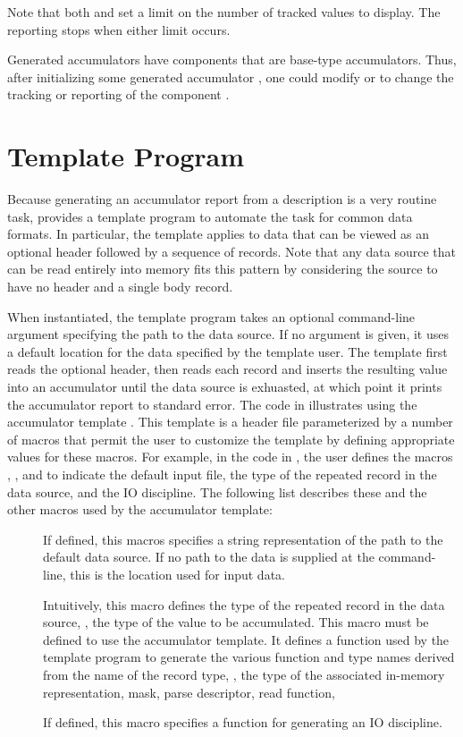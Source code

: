 Note that both  and  set a limit on
the number of tracked values to display.  The reporting stops when
either limit occurs.

Generated accumulators have components that are base-type
accumulators.  Thus, after initializing some generated accumulator
, one could modify  or
 to change the tracking or reporting of the
 component .

\section{Template Program}
Because generating an accumulator report from a \pads{} description is
a very routine task, \pads{} provides a template program to automate
the task for common data formats.  In particular, the template applies
to data that can be viewed as an optional header followed by a
sequence of records.  Note that any data source that can be read
entirely into memory fits this pattern by considering the source to
have no header and a single body record.

When instantiated, the template program takes an optional command-line
argument specifying the path to the data source. If no argument is
given, it uses a default location for the data specified by the
template user.
The template first reads the optional header, then
reads each record and inserts the resulting value into an
accumulator until the data source is exhuasted, at which point it
prints the accumulator report to standard error.
The code in 
illustrates using the accumulator template
. This template is a \C{} header file
parameterized by a number of macros that permit the user to customize
the template by defining appropriate values for these macros.  For
example, in the code in , the user defines the
macros , , and  to
indicate the default input file, the type of the repeated record in
the data source, and the IO discipline.
The following list describes these and the other macros used by the
accumulator template:

\begin{description}
\item[] If defined, this macros specifies a
  string representation of the path to the default data source.  If no
  path to the data is supplied at the command-line, this is the
  location used for input data.
\item[]  Intuitively, this macro defines the 
  type of the repeated record in the data source, \ie{}, the type of
  the value to be accumulated.  This macro must be defined to use the
  accumulator template.  It defines a function used by the template
  program to generate the various function and type names derived from
  the name of the record type, \ie{}, the type of the associated
  in-memory representation, mask, parse descriptor, read function,
  \etc{}
\item[] If defined, this macro specifies a function
  for generating an IO discipline.  
\end{description}
